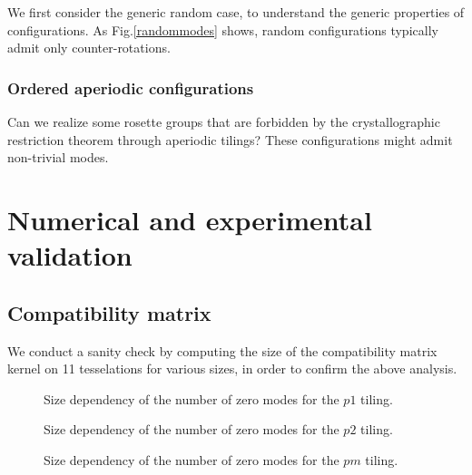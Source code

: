 			We first consider the generic random case, to understand the generic properties of configurations. As Fig.\ref{randommodes} shows, random configurations typically admit only counter-rotations.
			
\subsection{Ordered aperiodic configurations}
\label{sec:aperiorder}
		
		Can we realize some rosette groups that are forbidden by the crystallographic restriction theorem through aperiodic tilings? These configurations might admit non-trivial modes.

\chapter{Numerical and experimental validation}

\section{Compatibility matrix}

	We conduct a sanity check by computing the size of the compatibility matrix kernel on 11 tesselations for various sizes, in order to confirm the above analysis.
	
		\begin{figure}[!ht]
				\caption{Size dependency of the number of zero modes for the $p1$ tiling.}
				\label{fig:san:p1}
			\end{figure}
			
	
		\begin{figure}[!ht]
				\caption{Size dependency of the number of zero modes for the $p2$ tiling.}
				\label{fig:san:p2}
			\end{figure}
			
	
		\begin{figure}[!ht]
				\caption{Size dependency of the number of zero modes for the $pm$ tiling.}
				\label{fig:san:pm}
			\end{figure}

